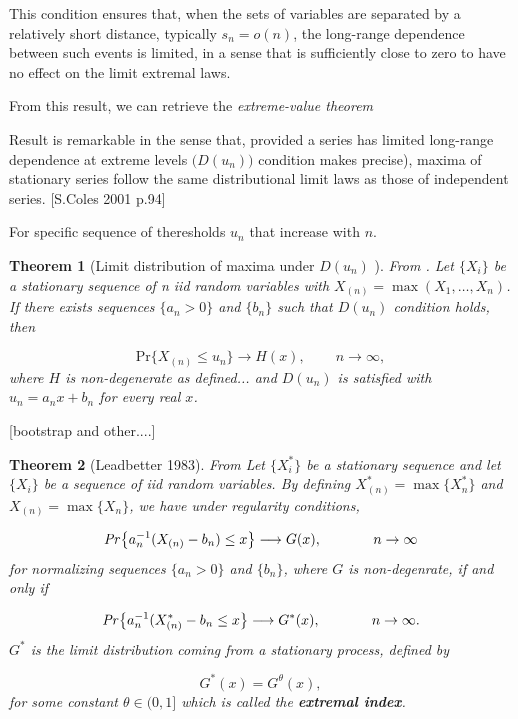 \documentclass[11pt,a4paper,openany ]{book}
\newtheorem{theorem}{Theorem}[chapter]
\begin{document}
This condition ensures that, when the sets of variables are separated by a relatively short distance, typically $s_n=o(n)$, the long-range dependence between such events is limited, in a sense that is sufficiently close to zero to have no effect on the limit extremal laws.

From this result, we can retrieve the \emph{extreme-value theorem}

Result is remarkable in the sense that, provided a series has limited long-range dependence at extreme levels $\big(D(u_n)\big)$ condition makes precise), maxima of stationary series follow the same distributional limit laws as those of independent series. [S.Coles 2001 p.94] 

For specific sequence of theresholds $u_n$ that increase with $n$.

\begin{theorem}[Limit distribution of maxima under $D({u_n})$ ]
	From \cite{leadbetter_extreme_1974}. 
	Let $\{X_i\}$ be a stationary sequence of n iid random variables with $X_{(n)}=\max (X_1,\dots, X_n)$. If there exists sequences $\{a_n>0\}$ and $\{b_n\}$ such that $D(u_n)$ condition holds, then 
	
	\begin{equation}
	\text{Pr}\{X_{(n)}\leq u_n\}\longrightarrow H(x), \ \ \ \ \ \ \ \, \ \ n\rightarrow\infty,
	\end{equation}
	where $H$ is non-degenerate as defined... and $D(u_n)$ is satisfied with $u_n=a_nx+b_n$ for every real $x$. 
	
\end{theorem}

[bootstrap and other....]


\begin{theorem}[Leadbetter 1983]
	From \cite[pp.]{coles_introduction_2001} 
	Let $\{X^*_i\}$ be a stationary sequence and let $\{X_i\}$ be a sequence of iid random variables. By defining  $X^*_{(n)}=\max  \{X^*_n\}$ and $X_{(n)}=\max \{X_n\}$, we have under regularity conditions, 
	
	\begin{equation*}
	\text{\emph{Pr}}\big\{a_n^{-1}(X_{(n)}-b_n)\leq x\big\}\longrightarrow G(x), \ \ \ \ \ \ \ \ \ \ \ n\rightarrow \infty
	\end{equation*}
	for normalizing sequences $\{a_n>0\}$ and $\{b_n\}$, where $G$ is non-degenrate, if and only if 
	
	\begin{equation*}\label{extremindex}
	\text{\emph{Pr}}\big\{a_n^{-1}(X^*_{(n)}-b_n\leq x \big\}\longrightarrow G^*(x), \ \ \ \ \ \ \ \ \ \ \  n\rightarrow\infty.
	\end{equation*}
	$G^*$ is the limit distribution coming from a stationary process, defined by
	
	\begin{equation}\label{extindex}
	G^*(x)=G^{\theta}(x),
	\end{equation}
	for some constant $\theta\in (0,1]$ which is called the \emph{\textbf{extremal index}}.
	
\end{theorem}
\end{document}
